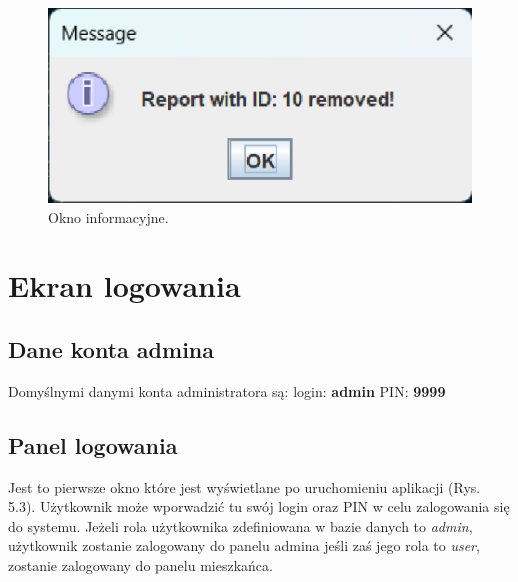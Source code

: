 \begin{figure}[H]
    \centering
    \includegraphics[width=\textwidth,height=0.2\textheight,keepaspectratio]{figures/app-images/info.eps}
    \caption{Okno informacyjne. \label{fig7}}
\end{figure}

\newpage
\section{Ekran logowania}
\subsection{Dane konta admina}
\noindent Domyślnymi danymi konta administratora są: 
\newline login: \textbf{admin}
\newline PIN: \textbf{9999}

\subsection{Panel logowania}
Jest to pierwsze okno które jest wyświetlane po uruchomieniu aplikacji (Rys. 5.3). Użytkownik może wporwadzić tu swój login oraz PIN w celu
zalogowania się do systemu. Jeżeli rola użytkownika zdefiniowana w bazie danych to \textit{admin}, użytkownik 
zostanie zalogowany do panelu admina jeśli zaś jego rola to \textit{user}, zostanie zalogowany do panelu mieszkańca.

